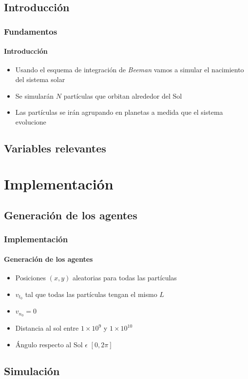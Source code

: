 \documentclass[hyperref={pdfpagelayout=SinglePage}]{beamer}
\begin{document}
\subsection{Introducción}

\begin{frame}
\frametitle{Fundamentos}
\framesubtitle{Introducción}
\begin{itemize}
	\item Usando el esquema de integración de \textit{Beeman} vamos a simular el nacimiento del sistema solar
	\item Se simularán $N$ partículas que orbitan alrededor del Sol
	\item Las partículas se irán agrupando en planetas a medida que el sistema evolucione
\end{itemize}
\end{frame}

\subsection{Variables relevantes}

\section{Implementación}

\subsection{Generación de los agentes}

\begin{frame}
\frametitle{Implementación}
\framesubtitle{Generación de los agentes}
\begin{itemize}
	\item Posiciones $(x,y)$ aleatorias para todas las partículas
	\item $v_{t_0}$ tal que todas las partículas tengan el mismo $L$
	\item $v_{n_0} = 0$
	\item Distancia al sol entre $1 \times 10^{9}$
 y $1 \times 10^{10}$
	\item Ángulo respecto al Sol $\epsilon$  $[0, 2 \pi]$
\end{itemize}
\end{frame}

\subsection{Simulación}
\end{document}
